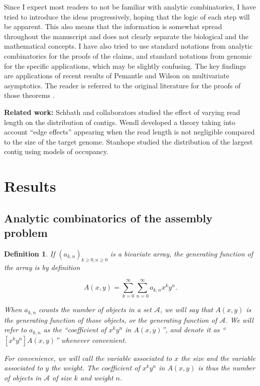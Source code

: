 \documentclass{article}
\newtheorem{definition}{Definition}
\begin{document}
Since I expect most readers to not be familiar with analytic
combinatorics, I have tried to introduce the ideas progressively, hoping
that the logic of each step will be apparent. This also means that the
information is somewhat spread throughout the manuscript and does not
clearly separate the biological and the mathematical concepts. I have also
tried to use standard notations from analytic combinatorics for the proofs
of the claims, and standard notations from genomic for the specific
applications, which may be slightly confusing.  The key findings are
applications of recent results of Pemantle and Wilson on multivariate
asymptotics. The reader is referred to the original literature for the
proofs of those theorems \cite{PemWil08,AnalComb2013}.

\textbf{Related work:} Schbath and collaborators \cite{pmid10890387}
studied the effect of varying read length on the distribution of contigs.
Wendl \cite{pmid16901236} developed a theory taking into account ``edge
effects'' appearing when the read length is not negligible compared to the
size of the target genome. Stanhope \cite{pmid20686599} studied the
distribution of the largest contig using models of occupancy.


\section{Results}

\subsection{Analytic combinatorics of the assembly problem}
\label{sec:config}

\begin{definition}
If $(a_{k,n})_{k \geq 0, n \geq 0}$ is a bivariate array, the generating
function of the array is by definition

\begin{equation*}
A(x,y) = \sum_{k=0}^\infty \sum_{n=0}^\infty a_{k,n}x^ky^n.
\end{equation*}

When $a_{k,n}$ counts the number of objects in a set $\mathcal{A}$, we
will say that $A(x,y)$ is the generating function of those objects, or the
generating function of $\mathcal{A}$. We will refer to $a_{k,n}$ as the
``coefficient of $x^ky^n$ in $A(x,y)$'', and denote it as ``$[x^ky^n]
A(x,y)$'' whenever convenient.

For convenience, we will call the variable associated to $x$ the
\emph{size} and the variable associated to $y$ the \emph{weight}. The
coefficient of $x^ky^n$ in $A(x,y)$ is thus the number of objects in
$\mathcal{A}$ of size $k$ and weight $n$.
\end{definition}
\end{document}

